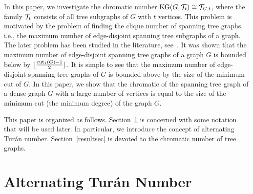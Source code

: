 \documentclass[11pt]{article}
\begin{document}
In this paper, we investigate the chromatic number ${\rm KG}(G,{\cal T}_t)\cong {\cal T}_{G,t}$, where 
the family ${\cal T}_t$ consists of all tree subgraphs of $G$ with $t$ vertices.
This problem is motivated by the problem of finding the clique number of spanning tree graphs, i.e., the maximum number of edge-disjoint spanning tree subgraphs of a graph. The later problem has been studied in the literature, see~\cite{MR0369117, MR1812338}. It was shown \cite{MR0369117} that  the maximum number of edge-disjoint spanning tree graphs of a graph $G$ is bounded below by $\lfloor{{\rm cut}_1(G)-1\over 2}\rfloor$.
It is simple to see that the maximum number of edge-disjoint spanning tree graphs of $G$ is bounded above by the size of the minimum cut of $G$. In this paper, we show that the chromatic of the spanning tree graph of a dense graph $G$ with a  large number of vertices is equal to the size of the minimum cut (the minimum degree) of the graph $G$. 

This paper is organized as follows. Section~\ref{altdef} is concerned with 
some notation that will be used later. In particular, we introduce the concept of alternating Tur\'an number. Section~\ref{resultsec} is devoted to the chromatic number of tree graphs. 
\section{Alternating Tur\'an Number}\label{altdef}
\end{document}
